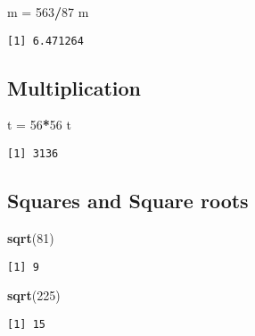 \documentclass[
]{article}
\newenvironment{Shaded}{\begin{snugshade}}{\end{snugshade}}
\newcommand{\DecValTok}[1]{\textcolor[rgb]{0.00,0.00,0.81}{#1}}
\newcommand{\FunctionTok}[1]{\textcolor[rgb]{0.13,0.29,0.53}{\textbf{#1}}}
\newcommand{\NormalTok}[1]{#1}
\newcommand{\OtherTok}[1]{\textcolor[rgb]{0.56,0.35,0.01}{#1}}
\newcommand{\SpecialCharTok}[1]{\textcolor[rgb]{0.81,0.36,0.00}{\textbf{#1}}}
\begin{document}
\begin{Shaded}
\begin{Highlighting}[]
\NormalTok{m }\OtherTok{=} \DecValTok{563}\SpecialCharTok{/}\DecValTok{87}
\NormalTok{m}
\end{Highlighting}
\end{Shaded}

\begin{verbatim}
[1] 6.471264
\end{verbatim}

\hypertarget{multiplication}{%
\subsection{Multiplication}\label{multiplication}}

\begin{Shaded}
\begin{Highlighting}[]
\NormalTok{t }\OtherTok{=} \DecValTok{56}\SpecialCharTok{*}\DecValTok{56}
\NormalTok{t}
\end{Highlighting}
\end{Shaded}

\begin{verbatim}
[1] 3136
\end{verbatim}

\hypertarget{squares-and-square-roots}{%
\subsection{Squares and Square roots}\label{squares-and-square-roots}}

\begin{Shaded}
\begin{Highlighting}[]
\FunctionTok{sqrt}\NormalTok{(}\DecValTok{81}\NormalTok{)}
\end{Highlighting}
\end{Shaded}

\begin{verbatim}
[1] 9
\end{verbatim}

\begin{Shaded}
\begin{Highlighting}[]
\FunctionTok{sqrt}\NormalTok{(}\DecValTok{225}\NormalTok{)}
\end{Highlighting}
\end{Shaded}

\begin{verbatim}
[1] 15
\end{verbatim}
\end{document}
